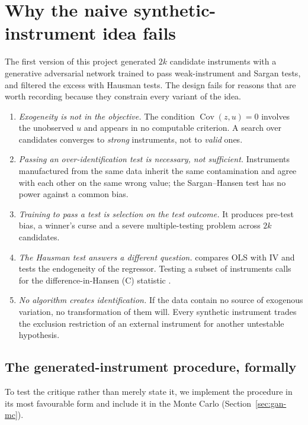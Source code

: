 \documentclass[11pt]{article}
\theoremstyle{definition}
\theoremstyle{remark}
\newcommand{\Cov}{\operatorname{Cov}}
\begin{document}
\section{Why the naive synthetic-instrument idea fails}\label{sec:why}

The first version of this project generated $2k$ candidate instruments with a generative
adversarial network trained to pass weak-instrument and Sargan tests, and filtered the excess with
Hausman tests. The design fails for reasons that are worth recording because they constrain every
variant of the idea.

\begin{enumerate}[label=\arabic*.]
  \item \emph{Exogeneity is not in the objective.} The condition $\Cov(z,u)=0$ involves the
  unobserved $u$ and appears in no computable criterion. A search over candidates converges to
  \emph{strong} instruments, not to \emph{valid} ones.
  \item \emph{Passing an over-identification test is necessary, not sufficient.} Instruments
  manufactured from the same data inherit the same contamination and agree with each other on the
  same wrong value; the Sargan--Hansen test \citep{sargan1958,hansen1982} has no power against a
  common bias.
  \item \emph{Training to pass a test is selection on the test outcome.} It produces pre-test bias,
  a winner's curse and a severe multiple-testing problem across $2k$ candidates.
  \item \emph{The Hausman test answers a different question.} \citet{hausman1978} compares OLS with
  IV and tests the endogeneity of the regressor. Testing a subset of instruments calls for the
  difference-in-Hansen (C) statistic \citep{eichenbaum1988}.
  \item \emph{No algorithm creates identification.} If the data contain no source of exogenous
  variation, no transformation of them will. Every synthetic instrument trades the exclusion
  restriction of an external instrument for another untestable hypothesis.
\end{enumerate}

\subsection{The generated-instrument procedure, formally}\label{sec:gan}

To test the critique rather than merely state it, we implement the procedure in its most
favourable form and include it in the Monte Carlo (Section~\ref{sec:gan-mc}).
\end{document}
